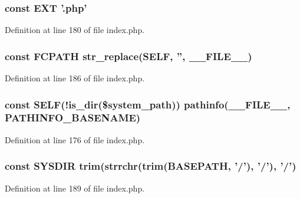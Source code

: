 \subsubsection[{E\-X\-T}]{\setlength{\rightskip}{0pt plus 5cm}const E\-X\-T '.php'}\label{index_8php_ad48706cc82e010be85f1398fb34c6510}


Definition at line 180 of file index.\-php.

\subsubsection[{F\-C\-P\-A\-T\-H}]{\setlength{\rightskip}{0pt plus 5cm}const F\-C\-P\-A\-T\-H str\-\_\-replace({\bf S\-E\-L\-F}, '', \-\_\-\-\_\-\-F\-I\-L\-E\-\_\-\-\_\-)}\label{index_8php_ae486546e58b2603595efedf9f95b3926}


Definition at line 186 of file index.\-php.

\subsubsection[{S\-E\-L\-F}]{\setlength{\rightskip}{0pt plus 5cm}const S\-E\-L\-F(!is\-\_\-dir(\$system\-\_\-path)) pathinfo(\-\_\-\-\_\-\-F\-I\-L\-E\-\_\-\-\_\-, P\-A\-T\-H\-I\-N\-F\-O\-\_\-\-B\-A\-S\-E\-N\-A\-M\-E)}\label{index_8php_a428c045e64680e1582ba74161e441a1c}


Definition at line 176 of file index.\-php.

\subsubsection[{S\-Y\-S\-D\-I\-R}]{\setlength{\rightskip}{0pt plus 5cm}const S\-Y\-S\-D\-I\-R trim(strrchr(trim({\bf B\-A\-S\-E\-P\-A\-T\-H}, '/'), '/'), '/')}\label{index_8php_ab645ae0961792b1f2b4b83f89cb95fa5}


Definition at line 189 of file index.\-php.

